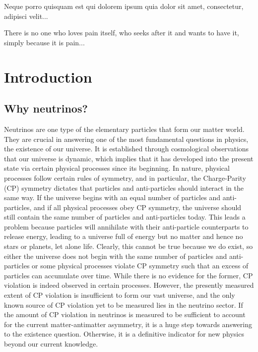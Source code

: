 \begin{savequote}[8cm]
\textlatin{Neque porro quisquam est qui dolorem ipsum quia dolor sit amet, consectetur, adipisci velit...}

There is no one who loves pain itself, who seeks after it and wants to have it, simply because it is pain...
\end{savequote}

\chapter{\label{ch:1-intro}Introduction} 

\minitoc

\section{Why neutrinos?}

   Neutrinos are one type of the elementary particles that form our matter world. 
   They are crucial in answering one of the most fundamental questions in physics, the existence of our universe. 
   It is established through cosmological observations that our universe is dynamic, which implies that it has developed into the present state via certain physical processes since its beginning.  
   In nature, physical processes follow certain rules of symmetry, and in particular, the Charge-Parity (CP) symmetry dictates that particles and anti-particles should interact in the same way. 
   If the universe begins with an equal number of particles and anti-particles, and if all physical processes obey CP symmetry, the universe should still contain the same number of particles and anti-particles today.
   This leads a problem because particles will annihilate with their anti-particle counterparts to release energy, leading to a universe full of energy but no matter and hence no stars or planets, let alone life.
   Clearly, this cannot be true because we do exist, so either the universe does not begin with the same number of particles and anti-particles or some physical processes violate CP symmetry such that an excess of particles can accumulate over time. 
   While there is no evidence for the former, CP violation is indeed observed in certain processes. 
   However, the presently measured extent of CP violation is insufficient to form our vast universe, and the only known source of CP violation yet to be measured lies in the neutrino sector. 
   If the amount of CP violation in neutrinos is measured to be sufficient to account for the current matter-antimatter asymmetry, it is a huge step towards answering to the existence question. 
   Otherwise, it is a definitive indicator for new physics beyond our current knowledge. 
   
